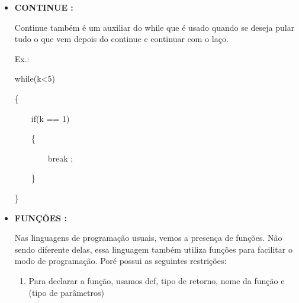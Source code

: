 \documentclass[a4paper]{article}
\begin{document}
{{{{{{{{{\begin{itemize}
            \textcolor{NavyBlue}{Ex.:}
            
            while(k<5)
            
            \{
            
            \ \ \ \ if(k == 1)
              
            \ \ \ \ \{
              
            \ \ \ \ \ \ \ \ \textcolor{NavyBlue}{break}
                    ;
              
            \ \ \ \ \}
           
            \}
        
\newpage %
            
        \item \textbf{CONTINUE :}
            
            Continue também é um auxiliar do while que é
            usado quando se deseja pular tudo o que vem
            depois do continue e continuar com o laço.
            
            \textcolor{NavyBlue}{Ex.:}
            
            while(k<5)
            
            \{
            
            \ \ \ \ if(k == 1)
              
            \ \ \ \ \{
              
            \ \ \ \ \ \ \ \ \textcolor{NavyBlue}{break}
                    ;
              
            \ \ \ \ \}
           
            \}
        
        \bigskip   
                           
        \item \textbf{FUNÇÕES :}
            
            Nas linguagens de programação usuais, vemos a
            presença de funções.
            Não sendo diferente delas, essa linguagem também
            utiliza funções para facilitar o modo de programação.
            Poré possui as seguintes restrições:
                       
            \begin{enumerate}
                
                \item Para declarar a função, usamos 
           	        \textcolor{NavyBlue}{def}, tipo de retorno, nome
            	    da função e (tipo de parâmetros)
            	

\end{enumerate}
\end{itemize}}}}}}}}}}
\end{document}
